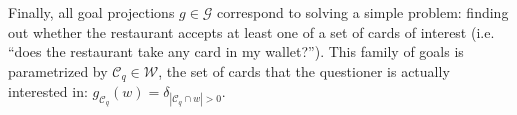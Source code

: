 \documentclass[11pt, floatsintext]{apa6}
\begin{document}
Finally, all goal projections $g \in \mathcal{G}$ correspond to solving a simple problem: finding out whether the restaurant accepts at least one of a set of cards of interest (i.e. ``does the restaurant take any card in my wallet?''). This family of goals is parametrized by $\mathcal{C}_q \in \mathcal{W}$, the set of cards that the questioner is actually interested in: 
$g_{\mathcal{C}_q}(w) = \delta_{|\mathcal{C}_q \cap w | > 0}$.


\end{document}
